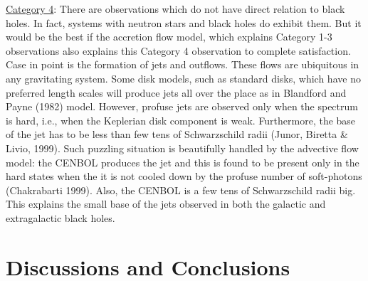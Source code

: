 \documentclass{ws-procs975x65}
\begin{document}
\noindent \underline{Category 4}: There are observations which do not have direct 
relation to black holes. In fact, systems with neutron stars and black 
holes do exhibit them. But it would be the best if the accretion flow 
model, which explains Category 1-3 observations also explains this 
Category 4 observation to complete satisfaction. Case in point is the 
formation of jets and outflows. These flows are ubiquitous in any 
gravitating system. Some disk models, such as standard disks, which
have no preferred length scales will produce jets all over the place 
as in Blandford and Payne (1982) model. However, profuse jets are 
observed only when the spectrum is hard, i.e., when the Keplerian 
disk component is weak. Furthermore, the base of the jet has to 
be less than few tens of Schwarzschild radii (Junor, Biretta \& Livio, 1999). Such
puzzling situation is beautifully handled by the advective flow model: 
the CENBOL produces the jet and this is found to be present only in the 
hard states when the it is not cooled down by the profuse number of 
soft-photons (Chakrabarti 1999).  Also, the CENBOL is a few tens of 
Schwarzschild radii big. This explains the small base of the jets observed
in both the galactic and extragalactic black holes.

\section{Discussions and Conclusions}
\end{document}
